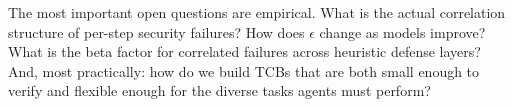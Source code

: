The most important open questions are empirical. What is the actual correlation structure of per-step security failures? How does $\epsilon$ change as models improve? What is the beta factor for correlated failures across heuristic defense layers? And, most practically: how do we build TCBs that are both small enough to verify and flexible enough for the diverse tasks agents must perform?
